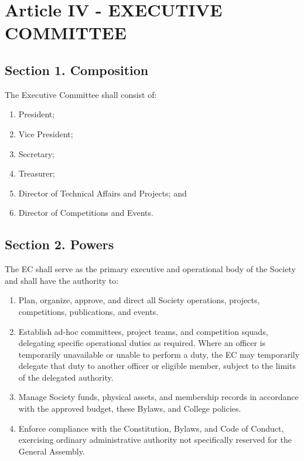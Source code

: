 \documentclass[a4paper]{article}
\begin{document}
\section*{Article IV - EXECUTIVE COMMITTEE}

\subsection*{Section 1. Composition}

The Executive Committee shall consist of:

\begin{enumerate}[leftmargin=*]
    \item President;
    \item Vice President;
    \item Secretary;
    \item Treasurer;
    \item Director of Technical Affairs and Projects; and
    \item Director of Competitions and Events.
\end{enumerate}

\subsection*{Section 2. Powers}
The EC shall serve as the primary executive and operational body of the Society and shall have the authority to:
\begin{enumerate}
  \item Plan, organize, approve, and direct all Society operations, projects, competitions, publications, and events.
  \item Establish ad-hoc committees, project teams, and competition squads, delegating specific operational duties as required. Where an officer is temporarily unavailable or unable to perform a duty, the EC may temporarily delegate that duty to another officer or eligible member, subject to the limits of the delegated authority.
  \item Manage Society funds, physical assets, and membership records in accordance with the approved budget, these Bylaws, and College policies.
  \item Enforce compliance with the Constitution, Bylaws, and Code of Conduct, exercising ordinary administrative authority not specifically reserved for the General Assembly.
\end{enumerate}
\end{document}
